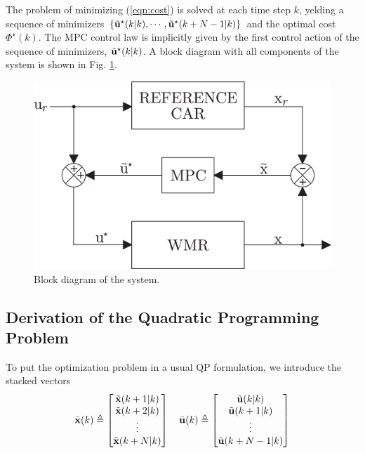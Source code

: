\documentclass[conference]{IEEEtran} %
\begin{document}
The problem of minimizing (\ref{eqn:cost}) is solved at each time step $k$, yelding a sequence of minimizers $\{\tilde{\bf u}^\star(k|k),\cdots,\tilde{\bf u}^\star(k+N-1|k)\}$ and the optimal cost $\Phi^\star(k)$. The MPC control law is implicitly given by the first control action of the sequence of minimizers, $\tilde{\bf u}^\star(k|k)$. A block diagram with all components of the system is shown in Fig. \ref{fig:bloco}.

\begin{figure}[htbp]
\begin{center}
    \includegraphics[width=.84\linewidth]{Figures/bloco.eps}
    \caption{Block diagram of the system.}
    \label{fig:bloco}
\end{center}
\end{figure}

\subsection{Derivation of the Quadratic Programming Problem}
\label{sec:qp}

To put the optimization problem in a usual QP formulation, we introduce the stacked vectors
\begin{equation*}
	\bar{\bf x}(k) \triangleq \begin{bmatrix}
		\tilde{\bf x}(k+1|k) \\ \tilde{\bf x}(k+2|k) \\ \vdots \\ \tilde{\bf x}(k+N|k) 
	\end{bmatrix} \quad
	\bar{\bf u}(k) \triangleq \begin{bmatrix}
		\tilde{\bf u}(k|k)  \\ \tilde{\bf u}(k+1|k) \\ \vdots \\ \tilde{\bf u}(k+N-1|k)
	\end{bmatrix}
\end{equation*}
\end{document}
